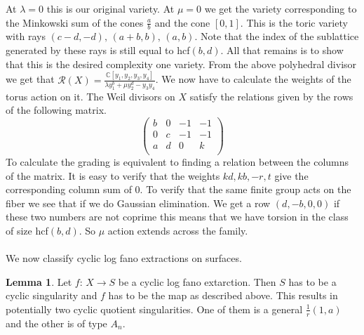 \documentclass[11pt]{amsart}
\theoremstyle{definition}
\theoremstyle{definition}
\theoremstyle{definition}
\theoremstyle{definition}
\theoremstyle{definition}
\newtheorem{lem}[thm]{Lemma}
\theoremstyle{definition}
\theoremstyle{definition}
\theoremstyle{definition}
\begin{document}
At $\lambda = 0$ this is our original variety. At $\mu = 0$ we get the variety corresponding to the Minkowski sum of the cones $\frac{a}{b}$ and the cone $\left[ 0, 1 \right]$. This is the toric variety with rays $(c-d,-d), \, (a+b, b), \, (a,b)$. Note that the index of the sublattice generated by these rays is still equal to hcf$(b, d)$. All that remains is to show that this is the desired complexity one variety. From the above polyhedral divisor we get that $\mathcal{R}(X) =\frac{\mathbb{C}[y_1, y_2, y_3,  y_4]}{\lambda y_1^b  + \mu y_2^d - y_3 y_4}$. We now have to calculate the weights of the torus action on it. The Weil divisors on $X$ satisfy the relations given by the rows of the following matrix. 
\[
 \left(
 \begin{array}{cccc}
b & 0 & -1 & -1  \\
0 & c & -1 & -1 \\
a & d & 0  & k \\
\end{array}
\right) 
\]
To calculate the grading is equivalent to finding a relation between the columns of the matrix. It is easy to verify that the weights $kd,kb,-r,t$ give the corresponding column sum of 0. To verify that the same finite group acts on the fiber we see that if we do Gaussian elimination. We get a row $(d, -b, 0 ,0)$ if these two numbers are not coprime this means that we have torsion in the class of size hcf$(b,d)$. So $\mathbb{\mu}$ action extends across the family. 
\\
\\
We now classify cyclic log fano extractions on surfaces.
\begin{lem}
Let $f: \, X \rightarrow S$ be a cyclic log fano extarction. Then $S$ has to be a cyclic singularity and $f$ has to be the map as described above. This results in potentially two cyclic quotient singularities. One of them is a general $\frac{1}{r} (1, a)$ and the other is of type $A_n$.
\end{lem}
\end{document}
